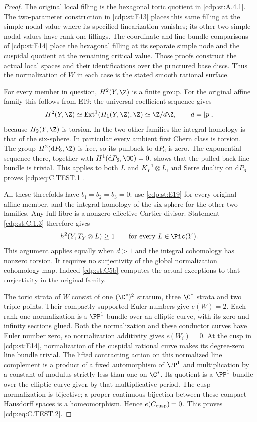 \begin{proof}
The original local filling is the hexagonal toric quotient
in \ref{cdp:st:A.4.1}. The two-parameter construction in \ref{cdp:st:E13} places this
same filling at the simple nodal value where its specified
linearization vanishes; its other two simple nodal values
have rank-one fillings. The coordinate and line-bundle
comparisons of \ref{cdp:st:E14} place the hexagonal filling at its
separate simple node and the cuspidal quotient at the
remaining critical value. Those proofs construct the actual
local spaces and their identifications over the punctured
base discs. Thus the normalization of $W$ in each case is
the stated smooth rational surface.

For every member in question, $H^2(Y,\Z)$ is a finite
group. For the original affine family this follows from E19:
the universal coefficient sequence gives
\[
 H^2(Y,\Z)\simeq\operatorname{Ext}^1(H_1(Y,\Z),\Z)
 \simeq\Z/d\Z,\qquad d=|p|,
\]
because $H_2(Y,\Z)$ is torsion. In the two other families
the integral homology is that of the six-sphere. In
particular every ambient first Chern class is torsion.
The group $H^2(\mathrm dP_6,\Z)$ is free, so its pullback
to $\mathrm dP_6$ is zero. The exponential sequence there,
together with $H^1(\mathrm dP_6,\OO)=0$, shows that the
pulled-back line bundle is trivial. This applies to both
$L$ and $K_Y^{-1}\otimes L$, and Serre duality on
$\mathrm dP_6$ proves \eqref{cdp:eq:C.TEST.1}.

All these threefolds have $b_1=b_2=b_3=0$: use \ref{cdp:st:E19} for
every original affine member, and the integral homology
of the six-sphere for the other two families. Any full
fibre is a nonzero effective Cartier divisor. Statement
\ref{cdp:st:C.1.3} therefore gives
\[
 h^2(Y,T_Y\otimes L)\geq 1
 \qquad\text{for every }L\in\Pic(Y).
\]
This argument applies equally when $d>1$ and the integral
cohomology has nonzero torsion. It requires no surjectivity
of the global normalization cohomology map. Indeed \ref{cdp:st:C5b}
computes the actual exceptions to that surjectivity in
the original family.

The toric strata of $W$ consist of one $(\C^*)^2$ stratum,
three $\C^*$ strata and two triple points. Their compactly
supported Euler numbers give $e(W)=2$.
Each rank-one normalization is a $\PP^1$-bundle over an
elliptic curve, with its zero and infinity sections glued.
Both the normalization and these conductor curves have
Euler number zero, so normalization additivity gives
$e(W_i)=0$. At the cusp in \ref{cdp:st:E14}, normalization of the
cuspidal rational curve makes its degree-zero line bundle
trivial. The lifted contracting action on this normalized
line complement is a product of a fixed automorphism of
$\PP^1$ and multiplication by a constant of modulus
strictly less than one on $\C^*$. Its quotient is a
$\PP^1$-bundle over the elliptic curve given by that
multiplicative period. The cusp normalization is
bijective; a proper continuous bijection between these
compact Hausdorff spaces is a homeomorphism. Hence
$e(C_{\rm cusp})=0$. This proves \eqref{cdp:eq:C.TEST.2}.


\end{proof}
